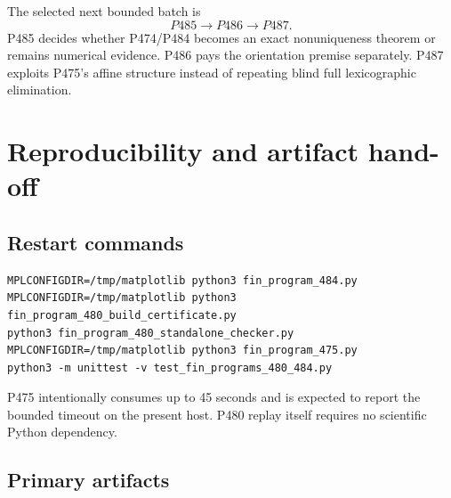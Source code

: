 \documentclass[11pt,a4paper,openany]{report}
\begin{document}
The selected next bounded batch is
\[
 \boxed{P485\longrightarrow P486\longrightarrow P487}.            \tag{9.1}
\]
P485 decides whether P474/P484 becomes an exact nonuniqueness theorem or
remains numerical evidence. P486 pays the orientation premise separately.
P487 exploits P475's affine structure instead of repeating blind full
lexicographic elimination.

\chapter{Reproducibility and artifact hand-off}

\section{Restart commands}

\begin{Verbatim}[fontsize=\small]
MPLCONFIGDIR=/tmp/matplotlib python3 fin_program_484.py
MPLCONFIGDIR=/tmp/matplotlib python3 fin_program_480_build_certificate.py
python3 fin_program_480_standalone_checker.py
MPLCONFIGDIR=/tmp/matplotlib python3 fin_program_475.py
python3 -m unittest -v test_fin_programs_480_484.py
\end{Verbatim}

P475 intentionally consumes up to 45 seconds and is expected to report the
bounded timeout on the present host. P480 replay itself requires no scientific
Python dependency.

\section{Primary artifacts}
\end{document}
